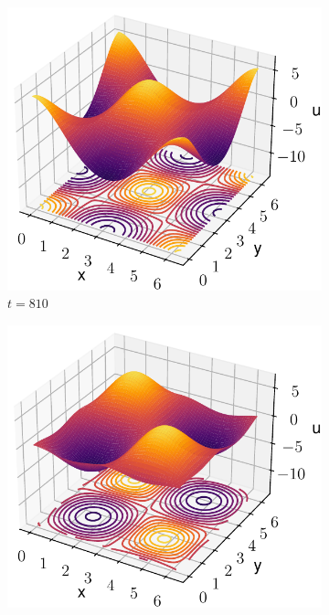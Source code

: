 \documentclass[twoside]{article}
\begin{document}
\begin{figure}[ht]
  \centering
  \begin{subfigure}[ht]{0.248\textwidth}
    \includegraphics[width=\textwidth]{images/slice_nu1_0.4_nu2_0.4_time_810.0.pdf}
    \caption{$t= 810$}
    \label{fig:he_a}
  \end{subfigure}\hspace{0.168\textwidth}
  \begin{subfigure}[ht]{0.248\textwidth}
    \includegraphics[width=\textwidth]{images/slice_nu1_0.4_nu2_0.4_time_910.0.pdf}

\end{subfigure}
\end{figure}
\end{document}
